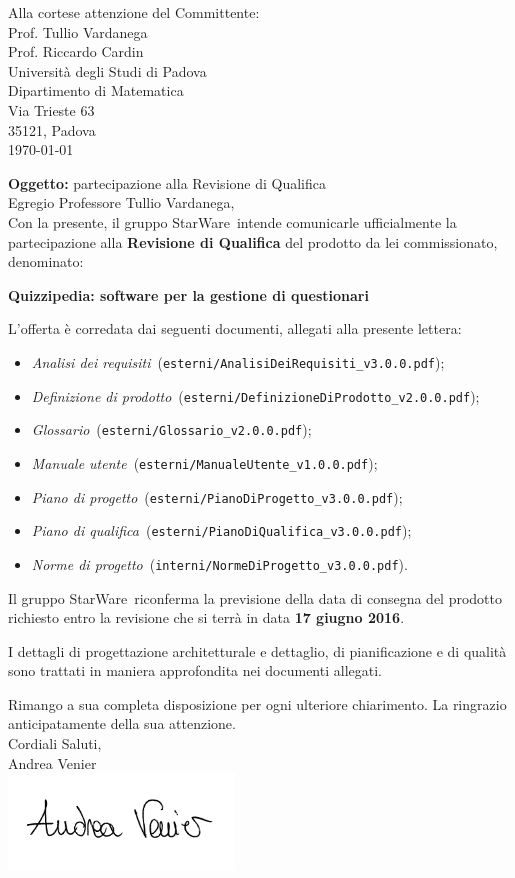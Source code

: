 \documentclass[12pt,a4paper]{article}
\title{\titoloDocumento}
\newcommand{\nomeGruppo}{StarWare}
\newcommand{\uni}{Universit\`{a} degli Studi di Padova}
\newcommand{\Cardin}{Prof. Riccardo Cardin}
\newcommand{\Vardanega}{Prof. Tullio Vardanega}
\newcommand{\prjL}{Quizzipedia: software per la gestione di questionari}
\newcommand{\AVE}{Andrea Venier}
\newcommand{\NdP}{\emph{Norme di progetto}}
\newcommand{\AdR}{\emph{Analisi dei requisiti}}
\newcommand{\PdP}{\emph{Piano di progetto}}
\newcommand{\PdQ}{\emph{Piano di qualifica}}
\newcommand{\DP}{\emph{Definizione di prodotto}}
\newcommand{\MU}{\emph{Manuale utente}}
\newcommand{\GL}{\emph{Glossario}}
\newcommand{\filePath}[1]{\texttt{#1}}
\begin{document}
\hspace{8cm}\begin{minipage}[t]{10cm}
	Alla cortese attenzione del Committente: \\
	\Vardanega \\
	\Cardin \\
	\uni \\
	Dipartimento di Matematica\\
	Via Trieste 63\\
	35121, Padova\\
	\today \\
\end{minipage}
\vspace{1cm}

\textbf{Oggetto:} partecipazione alla Revisione di Qualifica\\

Egregio Professore Tullio Vardanega,\\
Con la presente, il gruppo \nomeGruppo\ intende comunicarle ufficialmente la partecipazione alla \textbf{Revisione di Qualifica} del prodotto da lei commissionato, denominato:
\begin{center}
	\textbf{\prjL}
\end{center}
L’offerta è corredata dai seguenti documenti, allegati alla presente lettera:

\begin{itemize}
	\item \AdR\ (\filePath{esterni/AnalisiDeiRequisiti\_v3.0.0.pdf});
	\item \DP\ (\filePath{esterni/DefinizioneDiProdotto\_v2.0.0.pdf});
	\item \GL\ (\filePath{esterni/Glossario\_v2.0.0.pdf});
	\item \MU\ (\filePath{esterni/ManualeUtente\_v1.0.0.pdf});
	\item \PdP\ (\filePath{esterni/PianoDiProgetto\_v3.0.0.pdf});
	\item \PdQ\ (\filePath{esterni/PianoDiQualifica\_v3.0.0.pdf});
	\item \NdP\ (\filePath{interni/NormeDiProgetto\_v3.0.0.pdf}).
\end{itemize}

Il gruppo \nomeGruppo\ riconferma la previsione della data di consegna del prodotto richiesto entro la revisione che si terrà in data \textbf{17 giugno 2016}.

I dettagli di progettazione architetturale e dettaglio, di pianificazione e di qualità sono trattati in maniera approfondita nei documenti allegati.

Rimango a sua completa disposizione per ogni ulteriore chiarimento. La ringrazio anticipatamente della sua attenzione.\\

Cordiali Saluti,\\
\AVE \\
\includegraphics[width=6cm]{../img/firmaVenier.png}
\end{document}
